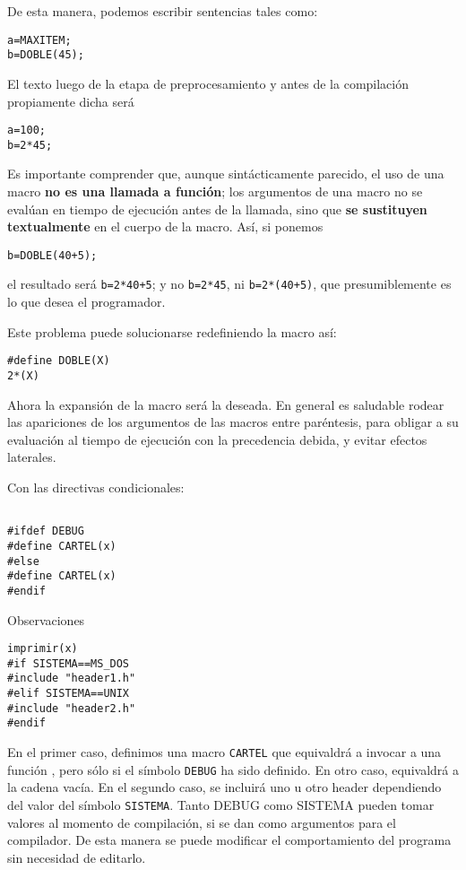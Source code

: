 De esta manera, podemos escribir sentencias tales como:
\begin{lstlisting}
a=MAXITEM;
b=DOBLE(45);
\end{lstlisting}
El texto luego de la etapa de preprocesamiento y antes de la compilación propiamente dicha será
\begin{lstlisting}
a=100;
b=2*45;
\end{lstlisting}

Es importante comprender que, aunque sintácticamente parecido, el uso de una macro \textbf{no es una
llamada a función}; los argumentos de una macro no se evalúan en tiempo de ejecución antes de la
llamada, sino que \textbf{se sustituyen textualmente} en el cuerpo de la macro. Así, si ponemos
\begin{lstlisting}
b=DOBLE(40+5);
\end{lstlisting}
el resultado será \texttt{b=2*40+5}; y no \texttt{b=2*45}, ni \texttt{b=2*(40+5)}, que presumiblemente es lo que desea el
programador.

Este problema puede solucionarse redefiniendo la macro así:
\begin{lstlisting}
#define DOBLE(X)
2*(X)
\end{lstlisting}
Ahora la expansión de la macro será la deseada. En general es saludable rodear las apariciones de los
argumentos de las macros entre paréntesis, para obligar a su evaluación al tiempo de ejecución con la
precedencia debida, y evitar efectos laterales.

Con las directivas condicionales:
\begin{lstlisting}

#ifdef DEBUG
#define CARTEL(x)
#else
#define CARTEL(x)
#endif
\end{lstlisting}
Observaciones
\begin{lstlisting}
imprimir(x)
#if SISTEMA==MS_DOS
#include "header1.h"
#elif SISTEMA==UNIX
#include "header2.h"
#endif
\end{lstlisting}
En el primer caso, definimos una macro \texttt{CARTEL} que equivaldrá a invocar a una función ,
pero sólo si el símbolo \texttt{DEBUG} ha sido definido. En otro caso, equivaldrá a la cadena vacía. En el
segundo caso, se incluirá uno u otro header dependiendo del valor del símbolo \texttt{SISTEMA}. Tanto
DEBUG como SISTEMA pueden tomar valores al momento de compilación, si se dan como
argumentos para el compilador. De esta manera se puede modificar el comportamiento del programa
sin necesidad de editarlo.

